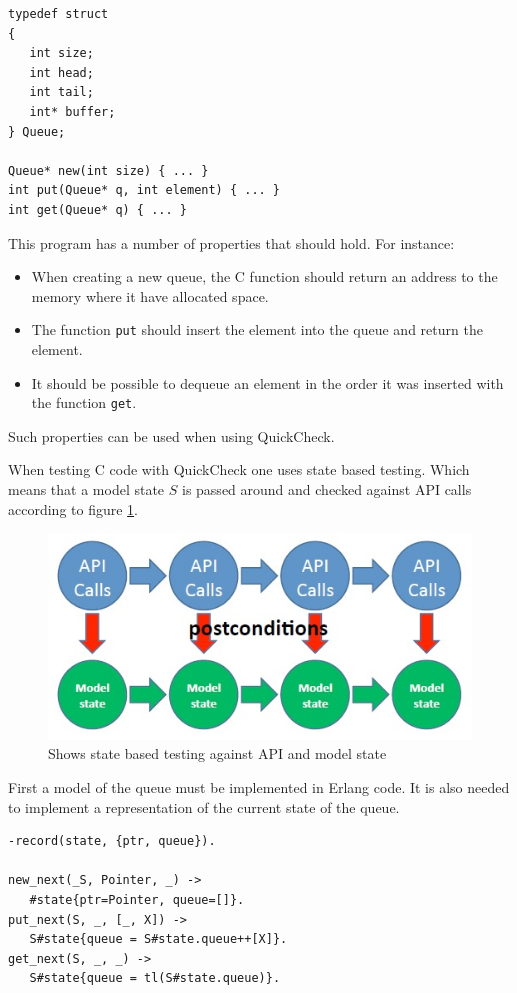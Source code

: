 \begin{lstlisting}[style=c]
typedef struct
{
   int size;
   int head;
   int tail;
   int* buffer;
} Queue;

Queue* new(int size) { ... }
int put(Queue* q, int element) { ... }
int get(Queue* q) { ... }
\end{lstlisting}
This program has a number of properties that should hold. For
instance:
\begin{itemize}
\item When creating a new queue, the C function should return an
address to the memory where it have allocated space.
\item The function \lstinline!put! should insert the element into the queue
and return the element.
\item It should be possible to dequeue an element in the order it was
inserted with the function \lstinline!get!.
\end{itemize}
Such properties can be used when using QuickCheck.

When testing C code with QuickCheck one uses state based
testing. Which means that a model state $S$ is passed around and
checked against API calls according to figure \ref{FIG:API_CALLS}.

\begin{figure}[!h]
  \includegraphics{pictures/api_calls.jpg}
  \caption{Shows state based testing against API and model state}
  \label{FIG:API_CALLS}
\end{figure}
First a model of the queue must be implemented in Erlang code.
It is also needed to implement a representation of the current state of the queue.

\begin{lstlisting}
-record(state, {ptr, queue}).

new_next(_S, Pointer, _) ->
   #state{ptr=Pointer, queue=[]}.
put_next(S, _, [_, X]) ->
   S#state{queue = S#state.queue++[X]}.
get_next(S, _, _) ->
   S#state{queue = tl(S#state.queue)}.
\end{lstlisting}

